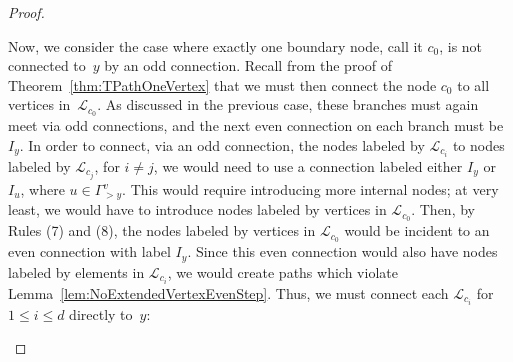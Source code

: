 \documentclass[10pt,a4paper]{amsart}
\numberwithin{equation}{section}
\newcommand{\new}[1]{{#1}}
\begin{document}
\begin{proof}
\begin{center}
\end{center}
Now, we consider the case where exactly one boundary node, call it $c_0$, is not connected to~$y$ by an odd connection. Recall from the proof of Theorem~\ref{thm:TPathOneVertex} that we must then connect the node $c_0$ to all vertices in~$\mathcal{L}_{c_0}$.
As discussed in the previous case, these branches must again meet via odd connections, and the next even connection on each branch must be $I_y$. In order to connect, via an odd connection, the nodes labeled by $\mathcal{L}_{c_i}$ to nodes labeled by $\mathcal{L}_{c_j}$, for $i \neq j$, we would need to use a connection labeled either $I_y$ or $I_u$, where $u\in\Gamma_{> y}^v$. This would require introducing more internal nodes; at very least, we would have to introduce nodes labeled by vertices in $\mathcal{L}_{c_0}$. Then, by Rules \new{(7) and (8)}, the nodes labeled by vertices in $\mathcal{L}_{c_0}$ would be incident to an even connection with label $I_y$. Since this even connection would also have nodes labeled by elements in $\mathcal{L}_{c_i}$, we would create paths which violate Lemma~\ref{lem:NoExtendedVertexEvenStep}. Thus, we must connect each $\mathcal{L}_{c_i}$ for $1 \leq i\leq d$ directly to~$y$:
\begin{center}
\end{center}
\end{proof}
\end{document}
